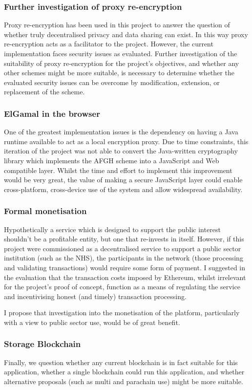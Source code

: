 \subsubsection{Further investigation of proxy re-encryption}

Proxy re-encryption has been used in this project to answer the question of whether truly decentralised privacy and data sharing can exist. In this way proxy re-encryption acts as a facilitator to the project. However, the current implementation faces security issues as evaluated. Further investigation of the suitability of proxy re-encryption for the project's objectives, and whether any other schemes might be more suitable, is necessary to determine whether the evaluated security issues can be overcome by modification, extension, or replacement of the scheme.

\subsubsection{ElGamal in the browser}

One of the greatest implementation issues is the dependency on having a Java runtime available to act as a local encryption proxy. Due to time constraints, this iteration of the project was not able to convert the Java-written cryptography library which implements the AFGH scheme into a JavaScript and Web compatible layer. Whilst the time and effort to implement this improvement would be very great, the value of making a secure JavaScript layer could enable cross-platform, cross-device use of the system and allow widespread availability.

\subsubsection{Formal monetisation}

Hypothetically a service which is designed to support the public interest shouldn't be a profitable entity, but one that re-invests in itself. However, if this project were commissioned as a decentralised service to support a public sector institution (such as the NHS), the participants in the network (those processing and validating transactions) would require some form of payment. I suggested in the evaluation that the transaction costs imposed by Ethereum, whilst irrelevant for the project's proof of concept, function as a means of regulating the service and incentivising honest (and timely) transaction processing.

I propose that investigation into the monetisation of the platform, particularly with a view to public sector use, would be of great benefit.

\subsubsection{Storage Blockchain}

Finally, we question whether any current blockchain is in fact suitable for this application, whether a single blockchain could run this application, and whether alternative proposals (such as multi and parachain use) might be more suitable.
